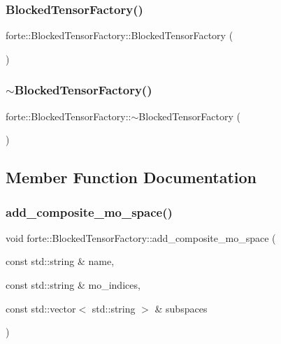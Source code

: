 \subsubsection{\texorpdfstring{Blocked\+Tensor\+Factory()}{BlockedTensorFactory()}}
{\footnotesize\ttfamily forte\+::\+Blocked\+Tensor\+Factory\+::\+Blocked\+Tensor\+Factory (\begin{DoxyParamCaption}{ }\end{DoxyParamCaption})}

\mbox{\label{classforte_1_1_blocked_tensor_factory_a7e8f4846afdf3a558725eecee7ebb7ed}} 
\subsubsection{\texorpdfstring{$\sim$\+Blocked\+Tensor\+Factory()}{~BlockedTensorFactory()}}
{\footnotesize\ttfamily forte\+::\+Blocked\+Tensor\+Factory\+::$\sim$\+Blocked\+Tensor\+Factory (\begin{DoxyParamCaption}{ }\end{DoxyParamCaption})}



\subsection{Member Function Documentation}
\mbox{\label{classforte_1_1_blocked_tensor_factory_aa0e2f489066c8636c897b5b15a48b438}} 
\subsubsection{\texorpdfstring{add\+\_\+composite\+\_\+mo\+\_\+space()}{add\_composite\_mo\_space()}}
{\footnotesize\ttfamily void forte\+::\+Blocked\+Tensor\+Factory\+::add\+\_\+composite\+\_\+mo\+\_\+space (\begin{DoxyParamCaption}\item[{const std\+::string \&}]{name,  }\item[{const std\+::string \&}]{mo\+\_\+indices,  }\item[{const std\+::vector$<$ std\+::string $>$ \&}]{subspaces }\end{DoxyParamCaption})}

